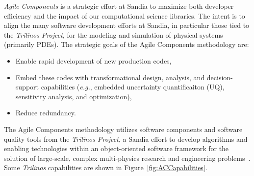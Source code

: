 \documentclass[pdf,ps2pdf,12pt,report]{SANDreport}
\theoremstyle{plain}
\theoremstyle{definition}
\theoremstyle{remark}
\numberwithin{equation}{section}
\begin{document}
\emph{Agile Components} is a strategic effort at Sandia to maximize both developer efficiency and the impact of our computational science libraries. The intent is to align the many software development efforts at Sandia, in particular those tied to the \emph{Trilinos Project}, for the modeling and simulation of physical systems (primarily PDEs). The strategic goals of the Agile Components methodology are:
\begin{itemize}
  \item Enable rapid development of new production codes,
  \item Embed these codes with transformational design, analysis, and decision-support capabilities ({\it e.g.}, embedded uncertainty quantificaiton (UQ), sensitivity analysis, and optimization),
  \item Reduce redundancy.
\end{itemize}

The Agile Components methodology utilizes software components and software quality tools from the \emph{Trilinos Project}, a Sandia effort to develop algorithms and enabling technologies within an object-oriented software framework for the solution of large-scale, complex multi-physics research and engineering problems~\cite{Trilinos-Overview}. Some \emph{Trilinos} capabilities are shown in Figure~\ref{fig:ACCapabilities}.
\end{document}
